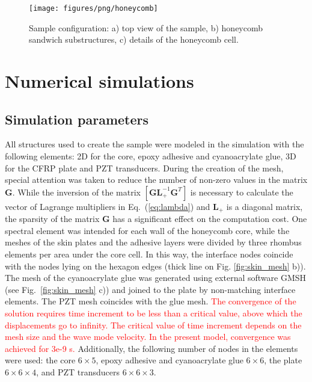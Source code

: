 \documentclass[sensors,article,submit,moreauthors,pdftex]{Definitions/mdpi}
\begin{document}
\begin{figure}
	\begin{center}
		\texttt{[image: figures/png/honeycomb]}
	\end{center}
	\caption{Sample configuration: a) top view of the sample, b) honeycomb sandwich substructures, c) details of the honeycomb cell.}
	\label{fig:honeycomb}
\end{figure}

\section{Numerical simulations}
\label{sec:numerical}
\subsection{Simulation parameters}
\label{sec:simulation}
All structures used to create the sample were modeled in the simulation with the following elements: 2D for the core, epoxy adhesive and cyanoacrylate glue, 3D for the CFRP plate and PZT transducers.
During the creation of the mesh, special attention was taken to reduce the number of non-zero values in the matrix \(\textbf{G}\). While the inversion of the matrix \(\left [\textbf{GL}_+^{-1}\textbf{G}^T\right ]\) is necessary to calculate the vector of Lagrange multipliers in Eq.~(\ref{eq:lambda}) and \(\textbf{L}_+\) is a diagonal matrix, the sparsity of the matrix \(\textbf{G}\) has a significant effect on the computation cost.
One spectral element was intended for each wall of the honeycomb core, while the meshes of the skin plates and the adhesive layers were divided by three rhombus elements per area under the core cell.
In this way, the interface nodes coincide with the nodes lying on the hexagon edges (thick line on Fig. \ref{fig:skin_mesh} b)).
The mesh of the cyanoacrylate glue was generated using external software GMSH \cite{geuzaine2009gmsh} (see Fig.~\ref{fig:skin_mesh} c)) and joined to the plate by non-matching interface elements. The PZT mesh coincides with the glue mesh.
\textcolor{red}{The convergence of the solution requires time increment to be less than a critical value, above which the displacements go to infinity.
The critical value of time increment depends on the mesh size and the wave mode velocity.
In the present model, convergence was achieved for 3e-9 s.}
Additionally, the following number of nodes in the elements were used: the core \(6 \times 5\), epoxy adhesive and cyanoacrylate glue \(6 \times 6\), the plate \(6 \times 6 \times 4\), and PZT transducers \(6 \times 6 \times 3\).
\end{document}
